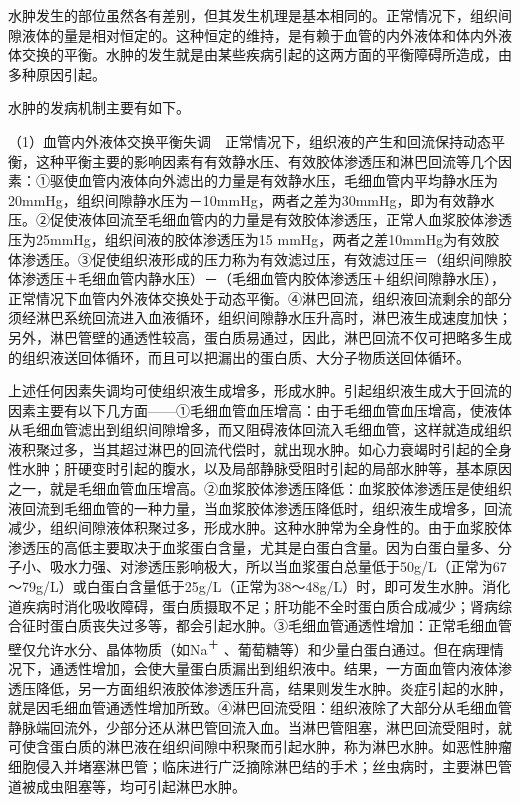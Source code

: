 水肿发生的部位虽然各有差别，但其发生机理是基本相同的。正常情况下，组织间隙液体的量是相对恒定的。这种恒定的维持，是有赖于血管的内外液体和体内外液体交换的平衡。水肿的发生就是由某些疾病引起的这两方面的平衡障碍所造成，由多种原因引起。

水肿的发病机制主要有如下。

（1）血管内外液体交换平衡失调　正常情况下，组织液的产生和回流保持动态平衡，这种平衡主要的影响因素有有效静水压、有效胶体渗透压和淋巴回流等几个因素：①驱使血管内液体向外滤出的力量是有效静水压，毛细血管内平均静水压为20mmHg，组织间隙静水压为－10mmHg，两者之差为30mmHg，即为有效静水压。②促使液体回流至毛细血管内的力量是有效胶体渗透压，正常人血浆胶体渗透压为25mmHg，组织间液的胶体渗透压为15
mmHg，两者之差10mmHg为有效胶体渗透压。③促使组织液形成的压力称为有效滤过压，有效滤过压＝（组织间隙胶体渗透压＋毛细血管内静水压）－（毛细血管内胶体渗透压＋组织间隙静水压），正常情况下血管内外液体交换处于动态平衡。④淋巴回流，组织液回流剩余的部分须经淋巴系统回流进入血液循环，组织间隙静水压升高时，淋巴液生成速度加快；另外，淋巴管壁的通透性较高，蛋白质易通过，因此，淋巴回流不仅可把略多生成的组织液送回体循环，而且可以把漏出的蛋白质、大分子物质送回体循环。

上述任何因素失调均可使组织液生成增多，形成水肿。引起组织液生成大于回流的因素主要有以下几方面------①毛细血管血压增高：由于毛细血管血压增高，使液体从毛细血管滤出到组织间隙增多，而又阻碍液体回流入毛细血管，这样就造成组织液积聚过多，当其超过淋巴的回流代偿时，就出现水肿。如心力衰竭时引起的全身性水肿；肝硬变时引起的腹水，以及局部静脉受阻时引起的局部水肿等，基本原因之一，就是毛细血管血压增高。②血浆胶体渗透压降低：血浆胶体渗透压是使组织液回流到毛细血管的一种力量，当血浆胶体渗透压降低时，组织液生成增多，回流减少，组织间隙液体积聚过多，形成水肿。这种水肿常为全身性的。由于血浆胶体渗透压的高低主要取决于血浆蛋白含量，尤其是白蛋白含量。因为白蛋白量多、分子小、吸水力强、对渗透压影响极大，所以当血浆蛋白总量低于50g/L（正常为67～79g/L）或白蛋白含量低于25g/L（正常为38～48g/L）时，即可发生水肿。消化道疾病时消化吸收障碍，蛋白质摄取不足；肝功能不全时蛋白质合成减少；肾病综合征时蛋白质丧失过多等，都会引起水肿。③毛细血管通透性增加：正常毛细血管壁仅允许水分、晶体物质（如Na\textsuperscript{＋}
、葡萄糖等）和少量白蛋白通过。但在病理情况下，通透性增加，会使大量蛋白质漏出到组织液中。结果，一方面血管内液体渗透压降低，另一方面组织液胶体渗透压升高，结果则发生水肿。炎症引起的水肿，就是因毛细血管通透性增加所致。④淋巴回流受阻：组织液除了大部分从毛细血管静脉端回流外，少部分还从淋巴管回流入血。当淋巴管阻塞，淋巴回流受阻时，就可使含蛋白质的淋巴液在组织间隙中积聚而引起水肿，称为淋巴水肿。如恶性肿瘤细胞侵入并堵塞淋巴管；临床进行广泛摘除淋巴结的手术；丝虫病时，主要淋巴管道被成虫阻塞等，均可引起淋巴水肿。

